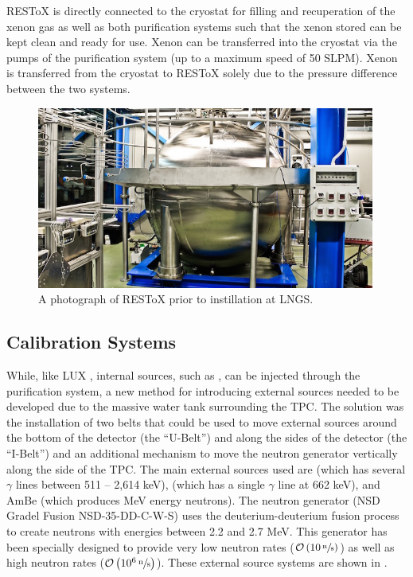  RESToX is directly connected to the cryostat for filling and recuperation of the xenon gas as well as both purification systems such that the xenon stored can be kept clean and ready for use.  Xenon can be transferred into the cryostat via the pumps of the purification system (up to a maximum speed of 50 SLPM). Xenon is transferred from the cryostat to RESToX solely due to the pressure difference between the two systems.
 
 \begin{figure}[t]
	\centering
	\includegraphics[width=0.99\textwidth]{xe1t_restox}
	\caption{A photograph of RESToX prior to instillation at LNGS.}
	\label{fig:xe1t_restox}
\end{figure}


  \subsection{Calibration Systems}
 \label{sec:xe1t_calibration_system}
 
While, like LUX \cite{akerib201783}, internal sources, such as , can be injected through the purification system, a new method for introducing external sources needed to be developed due to the massive water tank surrounding the TPC.  The solution was the installation of two belts that could be used to move external sources around the bottom of the detector (the ``U-Belt'') and along the sides of the detector (the ``I-Belt'') and an additional mechanism to move the neutron generator vertically along the side of the TPC.  The main external sources used are  (which has several $\gamma$ lines between 511 -- 2,614 keV),  (which has a single $\gamma$ line at 662 keV), and AmBe (which produces MeV energy neutrons).  The neutron generator (NSD Gradel Fusion NSD-35-DD-C-W-S) uses the deuterium-deuterium fusion process to create neutrons with energies between 2.2 and 2.7 MeV.  This generator has been specially designed to provide very low neutron rates ($\mathcal{O} \left(10 \, \sfrac{\textrm{n}}{\textrm{s}} \right)$) as well as high neutron rates ($\mathcal{O} \left(10^6 \, \sfrac{\textrm{n}}{\textrm{s}} \right)$).  These external source systems are shown in .


